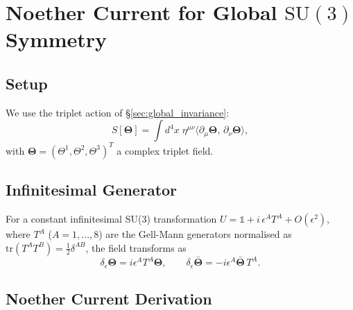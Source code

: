 %
%


\section{Noether Current for Global $\mathrm{SU}(3)$ Symmetry}
\label{sec:noether_current}

\subsection{Setup}

We use the triplet action of \S\ref{sec:global_invariance}:
\begin{equation}
  S[\boldsymbol{\Theta}]
  = \int d^4x\;
    \eta^{\mu\nu}
    \langle\partial_\mu\boldsymbol{\Theta},\,\partial_\nu\boldsymbol{\Theta}\rangle,
\end{equation}
with $\boldsymbol{\Theta}=(\Theta^1,\Theta^2,\Theta^3)^T$ a complex triplet field.

\subsection{Infinitesimal Generator}

For a constant infinitesimal SU(3) transformation
$U = \mathbb{1} + i\,\epsilon^A T^A + O(\epsilon^2)$, where $T^A$
($A=1,\ldots,8$) are the Gell-Mann generators normalised as
$\mathrm{tr}(T^A T^B)=\tfrac{1}{2}\delta^{AB}$, the field transforms as
\begin{equation}
  \delta_\epsilon\boldsymbol{\Theta}
  = i\epsilon^A T^A\boldsymbol{\Theta},
  \qquad
  \delta_\epsilon\bar{\boldsymbol{\Theta}}
  = -i\epsilon^A\bar{\boldsymbol{\Theta}}\,T^A.
\end{equation}

\subsection{Noether Current Derivation}

